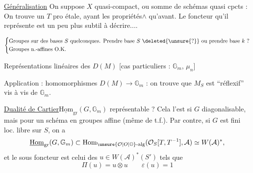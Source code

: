 
\uline{Généralisation} On suppose $X$ quasi-compact, ou somme de schémas quasi cpcts : On trouve un $T$  pro étale, ayant les  propriétés$\scriptscriptstyle\wedge$ qu'avant. Le foncteur qu'il représente est un peu plus subtil à décrire....


\[
\left\{\begin{aligned}
&\text{Groupes sur des bases } S\ \text{quelconques. Prendre base } S\ \deleted{\unsure{?}}\ \text{ou prendre base } k\ \text{?}\\
&\text{Groupes n.-affines O.K.}
\end{aligned}\right.
\]

Représentations linéaires des $D(M)$ [cas particuliers : $\mathbb{G}_m$, $\mu_n$]

Application : homomorphismes $D(M)\longrightarrow\mathbb{G}_m$ : on trouve que $M_S$ est ``réflexif'' vis à vis de $\mathbb{G}_m$.

\uline{Dualité de Cartier}\quad $\underline{\mathrm{Hom}}_{\mathrm{gr}}(G,\mathbb{G}_m)$  représentable ? Cela l'est si $G$ diagonalisable, mais  pour un schéma en groupes affine (même de t.f.). Par contre, si $G$ est fini loc. libre sur $S$, on a
\reversemarginpar{}\normalmarginpar
\[
\underline{\mathrm{Hom}}_{\mathrm{gr}}(G,\mathbb{G}_m)
\subset \mathrm{Hom}_{\unsure{\mathcal O|O|\mathbb O}\text{-alg}}
(\mathcal O_S[T,T^{-1}],\mathcal A)\simeq W(\mathcal A)^*,
\]
et le sous foncteur est celui des  $u\in W(\mathcal A)^*(S')$ tels que
\[
\Pi(u)=u\otimes u\qquad \varepsilon(u)=1
\]
\margin{[\,\uline{NB} On peut donc oublier la condition $u$ inv. car $\underline{\mathrm{Hom}}_{\mathrm{gr}}(G,\mathbb{G}_m)=\underline{\mathrm{Hom}}_{\mathrm{mon}}(G,\mathcal O^{\times})$.}

